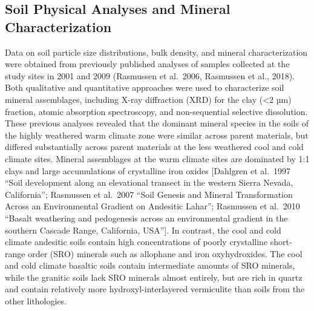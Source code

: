 \documentclass[english,man,floatsintext]{apa6}
\begin{document}
\hypertarget{soil-physical-analyses-and-mineral-characterization}{%
\subsection{Soil Physical Analyses and Mineral Characterization}\label{soil-physical-analyses-and-mineral-characterization}}

Data on soil particle size distributions, bulk density, and mineral characterization were obtained from previously published analyses of samples collected at the study sites in 2001 and 2009 (Rasmussen et al.~2006, Rasmussen et al., 2018). Both qualitative and quantitative approaches were used to characterize soil mineral assemblages, including X-ray diffraction (XRD) for the clay (\textless{}2 µm) fraction, atomic absorption spectroscopy, and non-sequential selective dissolution. These previous analyses revealed that the dominant mineral species in the soils of the highly weathered warm climate zone were similar across parent materials, but differed substantially across parent materials at the less weathered cool and cold climate sites. Mineral assemblages at the warm climate sites are dominated by 1:1 clays and large accumulations of crystalline iron oxides {[}Dahlgren et al.~1997 \enquote{Soil development along an elevational transect in the western Sierra Nevada, California}; Rasmussen et al.~2007 \enquote{Soil Genesis and Mineral Transformation Across an Environmental Gradient on Andesitic Lahar}; Rasmussen et al.~2010 \enquote{Basalt weathering and pedogenesis across an environmental gradient in the southern Cascade Range, California, USA}{]}. In contrast, the cool and cold climate andesitic soils contain high concentrations of poorly crystalline short-range order (SRO) minerals such as allophane and iron oxyhydroxides. The cool and cold climate basaltic soils contain intermediate amounts of SRO minerals, while the granitic soils lack SRO minerals almost entirely, but are rich in quartz and contain relatively more hydroxyl-interlayered vermiculite than soils from the other lithologies.
\end{document}
